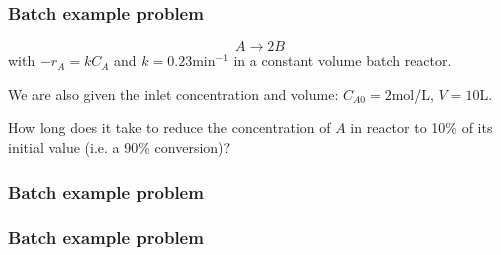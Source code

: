 \begin{frame}\frametitle{Batch example problem}
	$$A\longrightarrow2B$$
	with $-r_A = kC_A$ and $k = 0.23\text{min}^{-1}$ in a constant volume batch reactor.

	\vspace{12pt}
	We are also given the inlet concentration and volume: 
	$C_{A0} = 2$mol/L, $V=10$L. 
	
	\vspace{12pt}
	How long does it take to reduce the concentration of $A$ in reactor to 10\% of its initial value (i.e. a 90\% conversion)? 
\end{frame}

\begin{frame}\frametitle{Batch example problem}
	
\end{frame}

\begin{frame}\frametitle{Batch example problem}
	
\end{frame}

\begin{comment}
\begin{frame}\frametitle{Solution 1.1}
	For const V,
	\begin{align*}
		&\frac{d(N_A/V)}{dt} = -kC_A\\
		&\frac{dC_A}{dt} = -kC_A\\
		&\Rightarrow \int_{C_{A0}}^{C_{Af}}\frac{dC_A}{C_A} = -k\int_0^{t_f}dt\\
		&\Rightarrow \ln\frac{C_{Af}}{C_{A0}} = -kt_f
	\end{align*}
\end{frame}

\begin{frame}
	\begin{align*}
		\Rightarrow t_f &= -\frac{1}{k}\ln\left(\frac{C_{Af}}{C_{A0}}\right)
	\end{align*}
	Now plug in the numbers
	\begin{align*}
		t_f &= -\frac{1}{0.23}\ln\left(\frac{0.2}{2}\right)\\
		&= 10\text{min}
	\end{align*}
\end{frame}
\end{comment}


